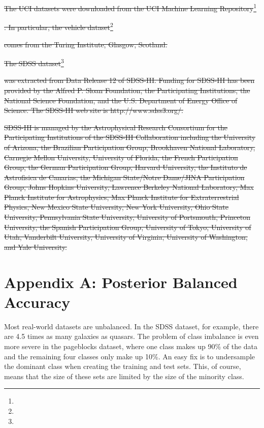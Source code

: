 \documentclass[fleqn,10pt,lineno]{wlpeerj} %
\providecommand{\DIFdeltex}[1]{{\protect\color{red}\sout{#1}}}                      %
\providecommand{\DIFdelend}{} %
\providecommand{\DIFdel}[1]{\texorpdfstring{\DIFdeltex{#1}}{}} %
\begin{document}
\DIFdel{The UCI datasets were downloaded from the UCI Machine Learning
Repository}\footnote{%
}%
\addtocounter{footnote}{-1}%
\DIFdel{. In particular, the
vehicle
dataset}\footnote{%
}
\addtocounter{footnote}{-1}%
\DIFdel{comes from the Turing Institute, Glasgow, Scotland.
}%

\DIFdel{The SDSS dataset}\footnote{%
} %
\addtocounter{footnote}{-1}%
\DIFdel{was
extracted from Data Release 12 of SDSS-III. Funding for SDSS-III has been
provided by the Alfred P. Sloan Foundation, the Participating Institutions, the
National Science Foundation, and the U.S. Department of Energy Office of
Science. The SDSS-III web site is http://www.sdss3.org/.
}%

\DIFdel{SDSS-III is managed by the Astrophysical Research Consortium for the
Participating Institutions of the SDSS-III Collaboration including the
University of Arizona, the Brazilian Participation Group, Brookhaven National
Laboratory, Carnegie Mellon University, University of Florida, the French
Participation Group, the German Participation Group, Harvard University, the
Instituto de Astrofisica de Canarias, the Michigan State/Notre Dame/JINA
Participation Group, Johns Hopkins University, Lawrence Berkeley National
Laboratory, Max Planck Institute for Astrophysics, Max Planck Institute for
Extraterrestrial Physics, New Mexico State University, New York University,
Ohio State University, Pennsylvania State University, University of Portsmouth,
Princeton University, the Spanish Participation Group, University of Tokyo,
University of Utah, Vanderbilt University, University of Virginia, University
of Washington, and Yale University.
}%

\DIFdelend 

\pagebreak

\section*{Appendix A: Posterior Balanced Accuracy}


Most real-world datasets are unbalanced. In the SDSS dataset, for example,
there are 4.5 times as many galaxies as quasars. The problem of class imbalance
is even more severe in the pageblocks dataset, where one class makes up 90\% of
the data and the remaining four classes only make up 10\%. An easy fix is to
undersample the dominant class when creating the training and test sets. This,
of course, means that the size of these sets are limited by the size of the
minority class.
\end{document}
